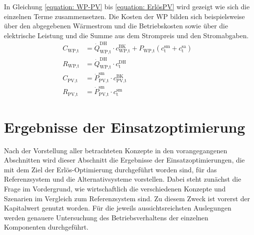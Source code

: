 In Gleichung \ref{equation: WP-PV} bis \ref{equation: ErlösPV} wird gezeigt wie sich die einzelnen Terme zusammensetzen. Die Kosten der \ac{WP} bilden sich beispielsweise über den abgegebenen Wärmestrom und die Betriebskosten sowie über die elektrische Leistung und die Summe aus dem Strompreis und den Stromabgaben. 
	\begin{align}
		\label{equation: WP-PV}
		C_\text{WP,t} &= \dot{Q}_\text{WP,t}^\text{DH} \cdot c_\text{WP,t}^\text{BK} + P_\text{WP,t} (c_\text{t}^\text{sm} + c_\text{t}^\text{sa})\\
		R_\text{WP,t} &= \dot{Q}_\text{WP,t}^\text{DH} \cdot c_\text{t}^\text{DH}\\
		C_\text{PV,t} &= \dot{P}_\text{PV,t}^\text{sm} \cdot c_\text{PV,t}^\text{BK} \\
		\label{equation: ErlösPV}\text{}
		R_\text{PV,t} &= \dot{P}_\text{PV,t}^\text{sm} \cdot c_\text{t}^\text{sm}
	\end{align}


\section{Ergebnisse der Einsatzoptimierung}
Nach der Vorstellung aller betrachteten Konzepte in den vorangegangenen Abschnitten wird dieser Abschnitt die Ergebnisse der Einsatzoptimierungen, die mit dem Ziel der Erlös-Optimierung durchgeführt worden sind, für das Referenzsystem und die Alternativsysteme vorstellen. Dabei steht zunächst die Frage im Vordergrund, wie wirtschaftlich die verschiedenen Konzepte und Szenarien im Vergleich zum Referenzsystem sind. Zu diesem Zweck ist vorerst der Kapitalwert genutzt worden. Für die jeweils aussichtsreichsten Auslegungen werden genauere Untersuchung des Betriebsverhaltens der einzelnen Komponenten durchgeführt.

